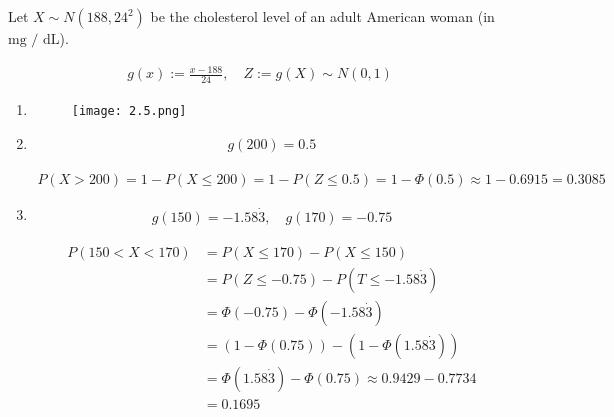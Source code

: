 \begin{solution}

Let $X \sim N(188, 24^2)$ be the cholesterol level of an adult American woman (in $\text{mg / dL}$).

\begin{align*}
    g(x) := \frac{x - 188}{24},
    \quad
    Z := g(X) \sim N(0, 1)
\end{align*}

\begin{enumerate}[label = (\alph*)]

    \item \phantom{}
    
    
    
    \begin{figure}[H]
        \centering
        \texttt{[image: 2.5.png]}
    \end{figure}

    \item

    \begin{align*}
        g(200) = 0.5
    \end{align*}

    \begin{align*}
        P(X > 200)
        =
        1 - P(X \leq 200)
        =
        1 - P(Z \leq 0.5)
        =
        1 - \Phi(0.5)
        \approx
        1 - 0.6915
        =
        0.3085
    \end{align*}

    \item

    \begin{align*}
        g(150) = -1.58 \dot 3,
        \quad
        g(170) = -0.75
    \end{align*}

    \begin{align*}
        P(150 < X < 170)
        & =
        P(X \leq 170) - P(X \leq 150) \\
        & =
        P(Z \leq -0.75) - P(T \leq -1.58 \dot 3) \\
        & =
        \Phi(-0.75) - \Phi(-1.58 \dot 3) \\
        & =
        (1 - \Phi(0.75)) - (1 - \Phi(1.58 \dot 3)) \\
        & =
        \Phi(1.58 \dot 3) - \Phi(0.75)
        \approx
        0.9429 - 0.7734 \\
        & =
        0.1695
    \end{align*}


\end{enumerate}
\end{solution}
